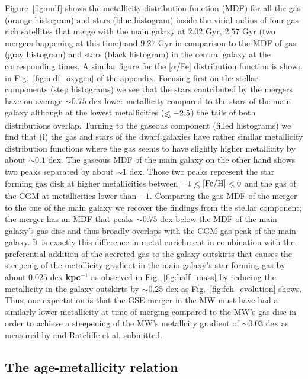 \documentclass[useAMS,usenatbib]{mnras}
\def\lesssim{\mathrel{\hbox{\rlap{\hbox{\lower4pt\hbox{$\sim$}}}\hbox{$<$}}}}
\begin{document}
 Figure~\ref{fig:mdf} shows the metallicity distribution function (MDF) for all the gas (orange histogram) and stars (blue histogram) inside the virial radius of four gas-rich satellites that merge with the main galaxy at $2.02$ Gyr, $2.57$ Gyr (two mergers happening at this time) and $9.27$ Gyr in comparison to the MDF of gas (gray histogram) and stars (black histogram) in the central galaxy at the corresponding times. A similar figure for the [$\alpha$/Fe] distribution function is shown in Fig.~\ref{fig:mdf_oxygen} of the appendix. Focusing first on the stellar components (step histograms) we see that the stars contributed by the mergers have on average $\sim0.75$ dex lower metallicity compared to the stars of the main galaxy although at the lowest metallicities ($\lesssim-2.5$) the tails of both distributions overlap. Turning to the gaseous component (filled histograms) we find that (i) the gas and stars of the dwarf galaxies have rather similar metallicity distribution functions where the gas seems to have slightly higher metallicity by about $\sim0.1$ dex. The gaseous MDF of the main galaxy on the other hand shows two peaks separated by about $\sim1$ dex. Those two peaks represent the star forming gas disk at higher metallicities between $-1\lesssim \rm{[Fe/H]}\lesssim0$ and the gas of the CGM at metallicities lower than $-1$. Comparing the gas MDF of the merger to the one of the main galaxy we recover the findings from the stellar component; the merger has an MDF that peaks $\sim0.75$ dex below the MDF of the main galaxy's gas disc and thus broadly overlaps with the CGM gas peak of the main galaxy. It is exactly this difference in metal enrichment in combination with the preferential addition of the accreted gas to the galaxy outskirts that causes the steepenig of the metallicity gradient in the main galaxy's star forming gas by about $0.025$ dex \textbf{kpc$^{-1}$} as observed in Fig.~\ref{fig:half_mass} by reducing the metallicity in the galaxy outskirts by $\sim0.25$ dex as Fig.~\ref{fig:feh_evolution} shows. Thus, our expectation is that the GSE merger in the MW must have had a similarly lower metallicity at time of merging compared to the MW's gas disc in order to achieve a steepening of the MW's metallcity gradient of $\sim0.03$ dex as measured by \cite{Lu2022b} and Ratcliffe et al. submitted.


\subsection{The age-metallicity relation}
\label{sec:age_fe}
\end{document}
